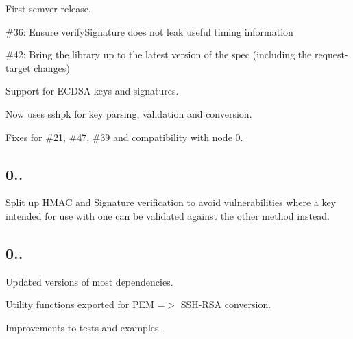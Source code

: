 \begin{DoxyItemize}
\item First semver release.
\item \#36\+: Ensure verify\+Signature does not leak useful timing information
\item \#42\+: Bring the library up to the latest version of the spec (including the request-\/target changes)
\item Support for E\+C\+D\+SA keys and signatures.
\item Now uses {\ttfamily sshpk} for key parsing, validation and conversion.
\item Fixes for \#21, \#47, \#39 and compatibility with node 0.
\end{DoxyItemize}

\subsection*{0..}


\begin{DoxyItemize}
\item Split up H\+M\+AC and Signature verification to avoid vulnerabilities where a key intended for use with one can be validated against the other method instead.
\end{DoxyItemize}

\subsection*{0..}


\begin{DoxyItemize}
\item Updated versions of most dependencies.
\item Utility functions exported for P\+EM =$>$ S\+S\+H-\/\+R\+SA conversion.
\item Improvements to tests and examples. 
\end{DoxyItemize}